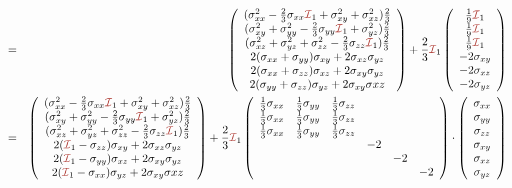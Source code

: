 \begin{eqnarray}
&=&
\left(
\begin{array}{c}
(\sigma_{xx}^2 -\frac23 \sigma_{xx} {\III}_1  +  \sigma_{xy}^2 +  \sigma_{xz}^2 ) \frac23 \\
(\sigma_{xy}^2 +  \sigma_{yy}^2 -\frac23 \sigma_{yy} {\III}_1  +  \sigma_{yz}^2 ) \frac23 \\
(\sigma_{xz}^2 +  \sigma_{yz}^2 + \sigma_{zz}^2 -\frac23 \sigma_{zz} {\III}_1  ) \frac23 \\
2(\sigma_{xx}+\sigma_{yy})\sigma_{xy} + 2 \sigma_{xz}\sigma_{yz} \\
2(\sigma_{xx}+\sigma_{zz})\sigma_{xz} + 2 \sigma_{xy}\sigma_{yz} \\
2(\sigma_{yy}+\sigma_{zz})\sigma_{yz} + 2 \sigma_{xy}\sigma{xz} 
\end{array}
\right) 
+
\frac{2}{3}{\III}_1
\left(
\begin{array}{c}
\frac19{\III}_1 \\
\frac19{\III}_1 \\
\frac19{\III}_1 \\
-2\sigma_{xy} \\
-2\sigma_{xz} \\
-2\sigma_{yz} \\
\end{array}
\right) \\
&=&
\left(
\begin{array}{c}
(\sigma_{xx}^2 -\frac23 \sigma_{xx} {\III}_1  +  \sigma_{xy}^2 +  \sigma_{xz}^2 ) \frac23 \\
(\sigma_{xy}^2 +  \sigma_{yy}^2 -\frac23 \sigma_{yy} {\III}_1  +  \sigma_{yz}^2 ) \frac23 \\
(\sigma_{xz}^2 +  \sigma_{yz}^2 + \sigma_{zz}^2 -\frac23 \sigma_{zz} {\III}_1  ) \frac23 \\
2({\III}_1-\sigma_{zz})\sigma_{xy} + 2 \sigma_{xz}\sigma_{yz} \\
2({\III}_1-\sigma_{yy})\sigma_{xz} + 2 \sigma_{xy}\sigma_{yz} \\
2({\III}_1-\sigma_{xx})\sigma_{yz} + 2 \sigma_{xy}\sigma{xz} 
\end{array}
\right) 
+
\frac{2}{3}{\III}_1
\left(
\begin{array}{cccccc}
\frac13 \sigma_{xx} & \frac13 \sigma_{yy} & \frac13 \sigma_{zz} && \\
\frac13 \sigma_{xx} & \frac13 \sigma_{yy} & \frac13 \sigma_{zz} && \\
\frac13 \sigma_{xx} & \frac13 \sigma_{yy} & \frac13 \sigma_{zz} && \\
 &&&-2 \\
&&&&-2 \\
&&&&&-2 \\
\end{array}
\right)
\cdot
\left(
\begin{array}{c}
\sigma_{xx}\\
\sigma_{yy}\\
\sigma_{zz}\\
\sigma_{xy}\\
\sigma_{xz}\\
\sigma_{yz}
\end{array}
\right)
\end{eqnarray}




